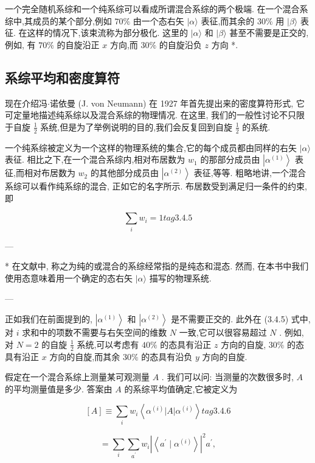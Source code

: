 一个完全随机系综和一个纯系综可以看成所谓混合系综的两个极端. 在一个混合系综中,其成员的某个部分,例如 ${70}\%$ 由一个态右矢 $|\alpha \rangle$ 表征,而其余的 ${30}\%$ 用 $|\beta \rangle$ 表征. 在这样的情况下,该束流称为部分极化. 这里的 $|\alpha \rangle$ 和 $|\beta \rangle$ 甚至不需要是正交的,例如, 有 ${70}\%$ 的自旋沿正 $x$ 方向,而 ${30}\%$ 的自旋沿负 $z$ 方向 *.

\subsection{系综平均和密度算符}

现在介绍冯$\cdot$诺依曼 (J. von Neumann) 在 1927 年首先提出来的密度算符形式, 它可定量地描述纯系综以及混合系综的物理情况. 在这里, 我们的一般性讨论不只限于自旋 $\frac{1}{2}$ 系统,但是为了举例说明的目的,我们会反复回到自旋 $\frac{1}{2}$ 的系统.

一个纯系综被定义为一个这样的物理系统的集合,它的每个成员都由同样的右矢 $|\alpha \rangle$ 表征. 相比之下,在一个混合系综内,相对布居数为 ${w}_{1}$ 的那部分成员由 $\left| {\alpha }^{\left( 1\right) }\right\rangle$ 表征,而相对布居数为 ${w}_{2}$ 的其他部分成员由 $\left| {\alpha }^{\left( 2\right) }\right\rangle$ 表征,等等. 粗略地讲,一个混合系综可以看作纯系综的混合, 正如它的名字所示. 布居数受到满足归一条件的约束, 即

$$
\mathop{\sum }\limits_{i}{w}_{i} = 1 tag{3. 4.5}
$$

---

* 在文献中, 称之为纯的或混合的系综经常指的是纯态和混态. 然而, 在本书中我们使用态意味着用一个确定的态右矢 $|\alpha \rangle$ 描写的物理系统.

---

正如我们在前面提到的, $\left| {\alpha }^{\left( 1\right) }\right\rangle$ 和 $\left| {\alpha }^{\left( 2\right) }\right\rangle$ 是不需要正交的. 此外在 (3.4.5) 式中,对 $i$ 求和中的项数不需要与右矢空间的维数 $N$ 一致,它可以很容易超过 $N$ . 例如,对 $N = 2$ 的自旋 $\frac{1}{2}$ 系统,可以考虑有 ${40}\%$ 的态具有沿正 $z$ 方向的自旋, ${30}\%$ 的态具有沿正 $x$ 方向的自旋,而其余 ${30}\%$ 的态具有沿负 $y$ 方向的自旋.

假定在一个混合系综上测量某可观测量 $A$ . 我们可以问: 当测量的次数很多时, $A$ 的平均测量值是多少. 答案由 $A$ 的系综平均值确定,它被定义为

$$
\left\lbrack A\right\rbrack \equiv \mathop{\sum }\limits_{i}{w}_{i}\left\langle {{\alpha }^{\left( i\right) }\left| A\right| {\alpha }^{\left( i\right) }}\right\rangle tag{3. 4.6}
$$

$$
= \mathop{\sum }\limits_{i}\mathop{\sum }\limits_{{a}^{\prime }}{w}_{i}{\left| \left\langle {a}^{\prime } \mid {\alpha }^{\left( i\right) }\right\rangle \right| }^{2}{a}^{\prime },
$$

